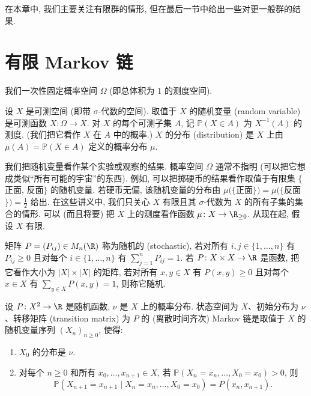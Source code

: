
在本章中, 我们主要关注有限群的情形, 但在最后一节中给出一些对更一般群的结果.

\section{有限 Markov 链}

我们一次性固定概率空间 $\Omega$ (即总体积为 $1$ 的测度空间).

\begin{definition}
\label{def:VI.1.1}
设 $X$ 是可测空间 (即带 $\sigma$-代数的空间). 取值于 $X$ 的随机变量 (random variable) 是可测函数 $X \colon \Omega \to X$.
对 $X$ 的每个可测子集 $A$, 记 $\mathbb{P}(X \in A)$ 为 $X^{-1}(A)$ 的测度. (我们把它看作 $X$ 在 $A$ 中的概率.) $X$ 的分布 (distribution) 是 $X$ 上由 $\mu(A) = \mathbb{P}(X \in A)$ 定义的概率分布 $\mu$.
\end{definition}

我们把随机变量看作某个实验或观察的结果. 概率空间 $\Omega$ 通常不指明 (可以把它想成类似``所有可能的宇宙''的东西). 例如, 可以把掷硬币的结果看作取值于有限集 $\{$正面, 反面$\}$ 的随机变量. 若硬币无偏, 该随机变量的分布由 $\mu(\{$正面$\}) = \mu(\{$反面$\}) = \frac{1}{2}$ 给出.
在这些讲义中, 我们只关心 $X$ 有限且其 $\sigma$-代数为 $X$ 的所有子集的集合的情形. 可以 (而且将要) 把 $X$ 上的测度看作函数 $\mu \colon X \to \R_{\geq 0}$.
从现在起, 假设 $X$ 有限.

\begin{definition}
\label{def:VI.1.2}
矩阵 $P = (P_{ij}) \in M_n(\R)$ 称为随机的 (stochastic), 若对所有 $i, j \in \{1, \ldots, n\}$ 有 $P_{ij} \geq 0$ 且对每个 $i \in \{1, \ldots, n\}$ 有 $\sum_{j=1}^n P_{ij} = 1$.
若 $P \colon X \times X \to \R$ 是函数, 把它看作大小为 $|X| \times |X|$ 的矩阵, 若对所有 $x, y \in X$ 有 $P(x, y) \geq 0$ 且对每个 $x \in X$ 有 $\sum_{y \in X}P(x, y) = 1$, 则称它随机.
\end{definition}

\begin{definition}
\label{def:VI.1.3}
设 $P \colon X^2 \to \R$ 是随机函数, $\nu$ 是 $X$ 上的概率分布. 状态空间为 $X$、初始分布为 $\nu$、转移矩阵 (transition matrix) 为 $P$ 的 (离散时间齐次) Markov 链是取值于 $X$ 的随机变量序列 $(X_n)_{n \geq 0}$, 使得:
\begin{enumerate}
\item[(a)] $X_0$ 的分布是 $\nu$.
\item[(b)] 对每个 $n \geq 0$ 和所有 $x_0, \ldots, x_{n+1} \in X$, 若 $\mathbb{P}(X_n = x_n, \ldots, X_0 = x_0) > 0$, 则
\[
\mathbb{P}(X_{n+1} = x_{n+1} \mid X_n = x_n, \ldots, X_0 = x_0) = P(x_n, x_{n+1}).
\]
\end{enumerate}
\end{definition}

